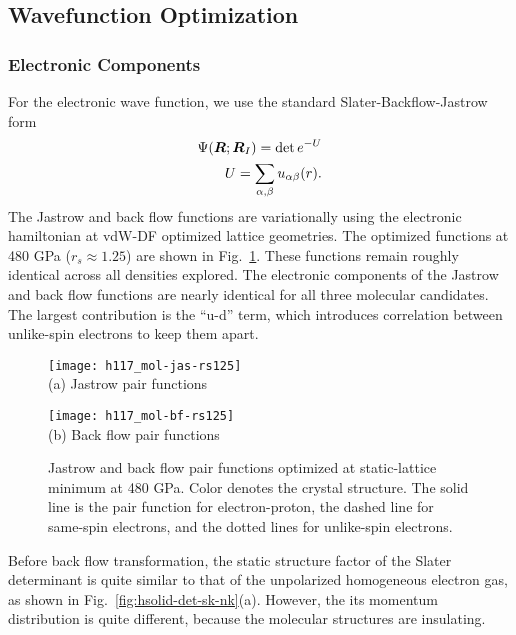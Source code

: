 \subsection{Wavefunction Optimization}

\subsubsection{Electronic Components}
For the electronic wave function, we use the standard Slater-Backflow-Jastrow form
\begin{align}
\Psi(\boldsymbol{R};\boldsymbol{R}_I) = \det e^{-U} \\
U = \sum_{\alpha,\beta} u_{\alpha\beta}(r).
\end{align}
The Jastrow and back flow functions are variationally using the electronic hamiltonian at vdW-DF optimized lattice geometries. The optimized functions at 480 GPa ($r_s\approx 1.25$) are shown in Fig.~\ref{fig:hsolid-static-jas-bf}.
These functions remain roughly identical across all densities explored.
The electronic components of the Jastrow and back flow functions are nearly identical for all three molecular candidates.
The largest contribution is the ``u-d'' term, which introduces correlation between unlike-spin electrons to keep them apart.

\begin{figure}[h]
\centering
\begin{minipage}{0.49\textwidth}
\centering
\texttt{[image: h117\_mol-jas-rs125]}\\
(a) Jastrow pair functions
\end{minipage}
\begin{minipage}{0.49\textwidth}
\centering
\texttt{[image: h117\_mol-bf-rs125]}\\
(b) Back flow pair functions
\end{minipage}
\caption{Jastrow and back flow pair functions optimized at static-lattice minimum at 480 GPa. Color denotes the crystal structure. The solid line is the pair function for electron-proton, the dashed line for same-spin electrons, and the dotted lines for unlike-spin electrons.}
\label{fig:hsolid-static-jas-bf}
\end{figure}

Before back flow transformation, the static structure factor of the Slater determinant is quite similar to that of the unpolarized homogeneous electron gas, as shown in Fig.~\ref{fig:hsolid-det-sk-nk}(a). However, the its momentum distribution is quite different, because the molecular structures are insulating.

